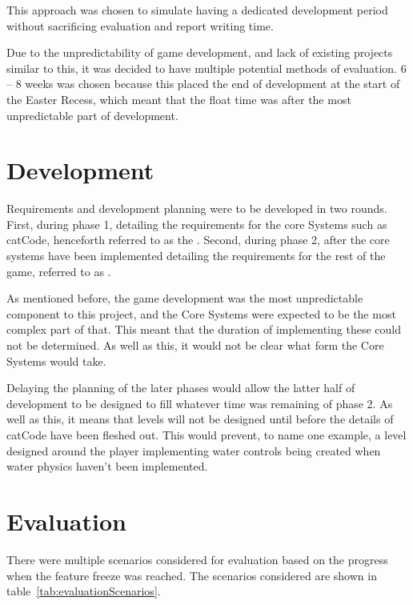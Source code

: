 This approach was chosen to simulate having a dedicated development period without sacrificing evaluation and report writing time. 

Due to the unpredictability of game development, and lack of existing projects similar to this, it was decided to have multiple potential methods of evaluation. 6 -- 8 weeks was chosen because this placed the end of development at the start of the Easter Recess, which meant that the float time was after the most unpredictable part of development.

\section{Development}\label{sec:methodology/ReqEng}

Requirements and development planning were to be developed in two rounds. First, during phase 1, detailing the requirements for the core Systems such as catCode, henceforth referred to as the . Second, during phase 2, after the core systems have been implemented detailing the requirements for the rest of the game, referred to as .

As mentioned before, the game development was the most unpredictable component to this project, and the Core Systems were expected to be the most complex part of that. This meant that the duration of implementing these could not be determined. As well as this, it would not be clear what form the Core Systems would take.

Delaying the planning of the later phases would allow the latter half of development to be designed to fill whatever time was remaining of phase 2. As well as this, it means that levels will not be designed until before the details of catCode have been fleshed out. This would prevent, to name one example, a level designed around the player implementing water controls being created when water physics haven't been implemented.

\section{Evaluation}

There were multiple scenarios considered for evaluation based on the progress when the feature freeze was reached. The scenarios considered are shown in table~\ref{tab:evaluationScenarios}.

